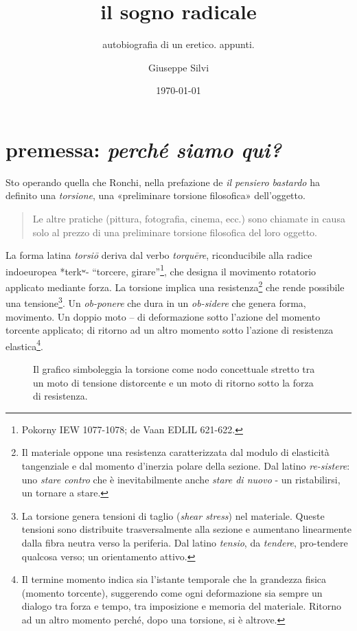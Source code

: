 \documentclass{gs}
\title{il sogno radicale}
\subtitle{autobiografia di un eretico. appunti.}
\author{Giuseppe Silvi}
\date{\today}
\begin{document}
\maketitle

\section*{premessa: \emph{perché siamo qui?}}

Sto operando quella che Ronchi, nella prefazione de \emph{il pensiero bastardo} \cite{ronchi2001} ha definito una \emph{torsione}, una «preliminare torsione filosofica» dell'oggetto.

\begin{quote}
\begin{sf}
\small
  Le altre pratiche (pittura, fotografia, cinema, ecc.) sono chiamate in causa solo al prezzo di una preliminare torsione filosofica del loro oggetto. \cite{ronchi2001}
  \end{sf}
\end{quote}

La forma latina \textit{torsiō} deriva dal verbo \textit{torquēre}, riconducibile alla radice indoeuropea *terkʷ- “torcere, girare”\footnote{Pokorny IEW 1077-1078; de Vaan EDLIL 621-622.}, che designa il movimento rotatorio applicato mediante forza. La torsione implica una resistenza\footnote{Il materiale oppone una resistenza caratterizzata dal modulo di elasticità tangenziale e dal momento d'inerzia polare della sezione. Dal latino \emph{re-sistere}: uno \emph{stare contro} che è inevitabilmente anche \emph{stare di nuovo} - un ristabilirsi, un tornare a stare.} che rende possibile una tensione\footnote{La torsione genera tensioni di taglio (\emph{shear stress}) nel materiale. Queste tensioni sono distribuite trasversalmente alla sezione e aumentano linearmente dalla fibra neutra verso la periferia. Dal latino \emph{tensio}, da \emph{tendere}, pro-tendere qualcosa verso; un orientamento attivo.}. Un \emph{ob-ponere} che dura in un \emph{ob-sidere} che genera forma, movimento. Un doppio moto – di deformazione sotto l'azione del momento torcente applicato; di ritorno ad un altro momento sotto l'azione di resistenza elastica\footnote{Il termine momento indica sia l'istante temporale che la grandezza fisica (momento torcente), suggerendo come ogni deformazione sia sempre un dialogo tra forza e tempo, tra imposizione e memoria del materiale. Ritorno ad un altro momento perché, dopo una torsione, si è altrove.}.

\begin{figure}[htbp]
\begin{center}
\caption{Il grafico simboleggia la torsione come nodo concettuale stretto tra un moto di tensione distorcente e un moto di ritorno sotto la forza di resistenza.}
\label{torsione}
\end{center}
\end{figure}
\end{document}
